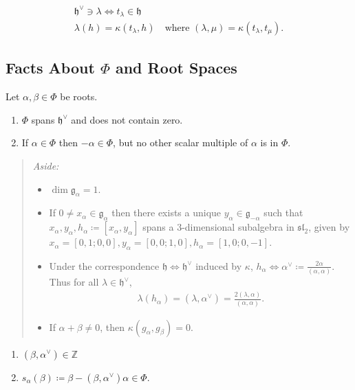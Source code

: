 \documentclass[11pt]{scrartcl}
\theoremstyle{definition}
\theoremstyle{theorem}
\theoremstyle{proof}
\theoremstyle{definition}
\theoremstyle{break}
\theoremstyle{problem}
\newcommand{\ZZ}[0]{{\mathbb{Z}}}
\newcommand{\definedas}[0]{\coloneqq}
\newcommand{\dual}[0]{^\vee}
\newcommand{\lieg}[0]{{\mathfrak{g}}}
\newcommand{\lieh}[0]{{\mathfrak{h}}}
\newcommand{\liesl}[0]{{\mathfrak{sl}}}
\begin{document}
\begin{align*}
\lieh\dual \ni \lambda \iff t_\lambda \in \lieh \\
\lambda(h) = \kappa(t_\lambda, h) \quad\text{where } (\lambda, \mu) = \kappa(t_\lambda, t_\mu)
.\end{align*}

\hypertarget{facts-about-phi-and-root-spaces}{%
\subsection{\texorpdfstring{Facts About \(\Phi\) and Root
Spaces}{Facts About \textbackslash Phi and Root Spaces}}\label{facts-about-phi-and-root-spaces}}

Let \(\alpha, \beta \in \Phi\) be roots.

\begin{enumerate}
\def\labelenumi{\arabic{enumi}.}
\item
  \(\Phi\) spans \(\lieh\dual\) and does not contain zero.
\item
  If \(\alpha \in \Phi\) then \(-\alpha \in \Phi\), but no other scalar
  multiple of \(\alpha\) is in \(\Phi\).
\end{enumerate}

\begin{quote}
\emph{Aside:}

\begin{itemize}
\item
  \(\dim \lieg_\alpha = 1\).
\item
  If \(0 \neq x_\alpha \in \lieg_\alpha\) then there exists a unique
  \(y_\alpha \in \lieg_{-\alpha}\) such that
  \(x_\alpha, y_\alpha, h_\alpha \definedas [x_\alpha, y_\alpha]\) spans
  a 3-dimensional subalgebra in \(\liesl_2\), given by
  \(x_\alpha = [0,1; 0,0], y_\alpha = [0,0; 1,0], h_\alpha = [1,0; 0,-1]\).
\item
  Under the correspondence \(\lieh \iff \lieh\dual\) induced by
  \(\kappa\),
  \(h_\alpha \iff \alpha\dual \definedas \frac{2\alpha}{(\alpha, \alpha)}\).
  Thus for all \(\lambda \in\lieh\dual\), \begin{align*}
  \lambda(h_\alpha) = (\lambda, \alpha\dual) = \frac{2(\lambda, \alpha)}{(\alpha, \alpha)}
  .\end{align*}
\item
  If \(\alpha + \beta \neq 0\), then \(\kappa(g_\alpha, g_\beta) = 0\).
\end{itemize}
\end{quote}

\begin{enumerate}
\def\labelenumi{\arabic{enumi}.}
\setcounter{enumi}{2}
\item
  \((\beta, \alpha\dual) \in \ZZ\)
\item
  \(s_\alpha(\beta) \definedas \beta - (\beta, \alpha\dual)\alpha \in \Phi\).
\end{enumerate}
\end{document}
